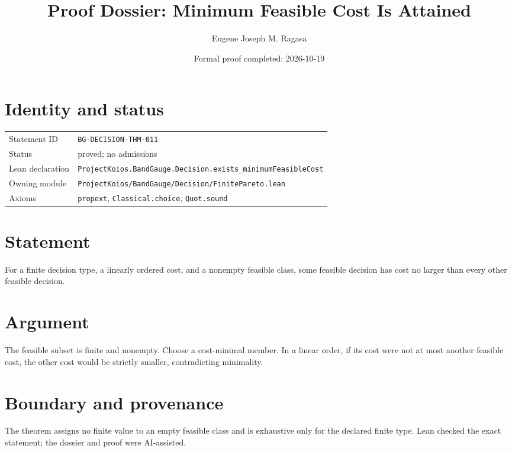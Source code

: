 \documentclass[11pt]{article}
\title{Proof Dossier: Minimum Feasible Cost Is Attained}
\author{Eugene Joseph M. Ragasa}
\date{Formal proof completed: 2026-10-19}
\begin{document}
\maketitle
\section{Identity and status}
\begin{tabularx}{\textwidth}{@{}lX@{}}\toprule
Statement ID & \texttt{BG-DECISION-THM-011} \\
Status & proved; no admissions \\
Lean declaration & \texttt{ProjectKoios.BandGauge.Decision.exists\_minimumFeasibleCost} \\
Owning module & \texttt{ProjectKoios/BandGauge/Decision/FinitePareto.lean} \\
Axioms & \texttt{propext}, \texttt{Classical.choice}, \texttt{Quot.sound} \\
\bottomrule\end{tabularx}
\section{Statement}
For a finite decision type, a linearly ordered cost, and a nonempty feasible class, some
feasible decision has cost no larger than every other feasible decision.
\section{Argument}
The feasible subset is finite and nonempty. Choose a cost-minimal member. In a linear
order, if its cost were not at most another feasible cost, the other cost would be
strictly smaller, contradicting minimality.
\section{Boundary and provenance}
The theorem assigns no finite value to an empty feasible class and is exhaustive only for
the declared finite type. Lean checked the exact statement; the dossier and proof were
AI-assisted.
\end{document}
